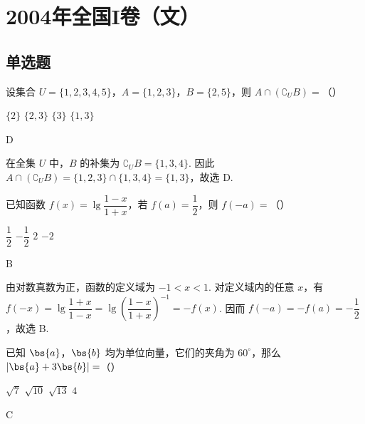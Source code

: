 \chapter{2004年全国I卷（文）}
\section{单选题}

\begin{problem}
设集合 \(U = \{1, 2, 3, 4, 5\}\)，\(A = \{1, 2, 3\}\)，\(B = \{2, 5\}\)，则 \(A \cap (\complement_U B) =\)（\quad）

\choices
    {\(\{2\}\)}
    {\(\{2, 3\}\)}
    {\(\{3\}\)}
    {\(\{1,3\}\)}
\end{problem}

\begin{answer}
D
\end{answer}

\begin{solution}
在全集 \(U\) 中，\(B\) 的补集为 \(\complement_U B=\{1,3,4\}\). 因此 \(A\cap(\complement_U B)=\{1,2,3\}\cap\{1,3,4\}=\{1,3\}\)，故选 D.
\end{solution}

\begin{problem}
已知函数 \(f(x)=\lg\dfrac{1-x}{1+x}\)，若 \(f(a)=\dfrac12\)，则 \(f(-a)=\)（\quad）

\choices
    {\(\dfrac12\)}
    {\(-\dfrac12\)}
    {\(2\)}
    {\(-2\)}
\end{problem}

\begin{answer}
B
\end{answer}

\begin{solution}
由对数真数为正，函数的定义域为 \(-1<x<1\). 对定义域内的任意 \(x\)，有 \(f(-x)=\lg\dfrac{1+x}{1-x}=\lg\left(\dfrac{1-x}{1+x}\right)^{-1}=-f(x)\). 因而 \(f(-a)=-f(a)=-\dfrac12\)，故选 B.
\end{solution}

\begin{problem}
已知 \(\bs{a}\)，\(\bs{b}\) 均为单位向量，它们的夹角为 \(60^{\circ}\)，那么 \(\left|\bs{a}+3\bs{b}\right|=\)（\quad）

\choices
    {\(\sqrt7\)}
    {\(\sqrt{10}\)}
    {\(\sqrt{13}\)}
    {\(4\)}
\end{problem}

\begin{answer}
C
\end{answer}

